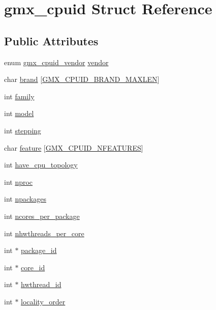 \hypertarget{structgmx__cpuid}{\section{gmx\-\_\-cpuid \-Struct \-Reference}
\label{structgmx__cpuid}
}
\subsection*{\-Public \-Attributes}
\begin{DoxyCompactItemize}
\item 
enum \hyperlink{include_2gmx__cpuid_8h_aebe7c31e0af516c77815cad730fad0e4}{gmx\-\_\-cpuid\-\_\-vendor} \hyperlink{structgmx__cpuid_a852182f7412b394d2ec3da6bca3309d8}{vendor}
\item 
char \hyperlink{structgmx__cpuid_ab110b169daeba53c26e186366b33fadf}{brand} \mbox{[}\hyperlink{gmx__cpuid_8c_a444e6d78bd8037ac4451a159cd26caec}{\-G\-M\-X\-\_\-\-C\-P\-U\-I\-D\-\_\-\-B\-R\-A\-N\-D\-\_\-\-M\-A\-X\-L\-E\-N}\mbox{]}
\item 
int \hyperlink{structgmx__cpuid_ac0be9298142da8b56b41ed4f2252e3d0}{family}
\item 
int \hyperlink{structgmx__cpuid_a90a9881d9dfc32cbbbb83bfa13556956}{model}
\item 
int \hyperlink{structgmx__cpuid_a1bef8166bf64e18883c1b94f7f87e98b}{stepping}
\item 
char \hyperlink{structgmx__cpuid_a730ac422d394482fe70c57e1dab7684e}{feature} \mbox{[}\hyperlink{share_2template_2gromacs_2gmx__cpuid_8h_aad8211e7ee233fd7686b1138cc41a347a47c3647340278c0916fb392da173e542}{\-G\-M\-X\-\_\-\-C\-P\-U\-I\-D\-\_\-\-N\-F\-E\-A\-T\-U\-R\-E\-S}\mbox{]}
\item 
int \hyperlink{structgmx__cpuid_a8b41e628c279169c44b6089e1eee2559}{have\-\_\-cpu\-\_\-topology}
\item 
int \hyperlink{structgmx__cpuid_a0d5d66df033fcb261105faf61517824e}{nproc}
\item 
int \hyperlink{structgmx__cpuid_a93ebc21ce5a96d0066df5c08ae3b8ebf}{npackages}
\item 
int \hyperlink{structgmx__cpuid_a292bede43db4c30e15636dffe3816864}{ncores\-\_\-per\-\_\-package}
\item 
int \hyperlink{structgmx__cpuid_a7fc326d32d51b7f8f9dfa89c49d1be2e}{nhwthreads\-\_\-per\-\_\-core}
\item 
int $\ast$ \hyperlink{structgmx__cpuid_aa7adf6d90a81704fda5095bfe7a67e6c}{package\-\_\-id}
\item 
int $\ast$ \hyperlink{structgmx__cpuid_a2ef87d5793f6687739852b0a3203fbb1}{core\-\_\-id}
\item 
int $\ast$ \hyperlink{structgmx__cpuid_a9ceff2bee91a188addaa5700e41e12a7}{hwthread\-\_\-id}
\item 
int $\ast$ \hyperlink{structgmx__cpuid_abcce45f7b712d32568ea98805cd84292}{locality\-\_\-order}
\end{DoxyCompactItemize}



